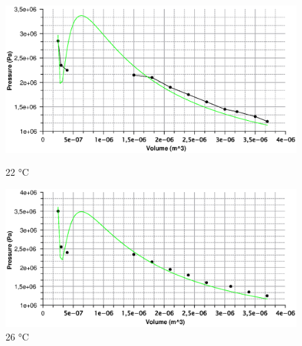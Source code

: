 \documentclass{scrartcl}
\begin{document}
\begin{figure}[htbp]
  \centering
  \begin{minipage}[b]{0.4\textwidth}
    \includegraphics[width=\textwidth]{vdw22.eps}
    \caption{22 °C}
  \end{minipage}
  \hfill
  \begin{minipage}[b]{0.4\textwidth}
    \includegraphics[width=\textwidth]{vdw26.eps}
    \caption{26 °C}
  \end{minipage}
\end{figure}
\end{document}
